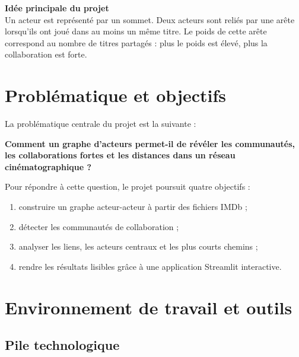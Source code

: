 \documentclass[a4paper,12pt]{article}
\begin{document}
\begin{tcolorbox}[infobox]
\textbf{Idée principale du projet}\\
Un acteur est représenté par un sommet. Deux acteurs sont reliés par une arête lorsqu'ils ont joué dans au moins un même titre. Le poids de cette arête correspond au nombre de titres partagés : plus le poids est élevé, plus la collaboration est forte.
\end{tcolorbox}

\section{Problématique et objectifs}

La problématique centrale du projet est la suivante :

\begin{center}
\begin{tcolorbox}[greenbox, width=0.9\textwidth]
\centering\bfseries
Comment un graphe d'acteurs permet-il de révéler les communautés, les collaborations fortes et les distances dans un réseau cinématographique ?
\end{tcolorbox}
\end{center}

Pour répondre à cette question, le projet poursuit quatre objectifs :

\begin{enumerate}[leftmargin=1.4cm, itemsep=4pt]
  \item construire un graphe acteur-acteur à partir des fichiers IMDb ;
  \item détecter les communautés de collaboration ;
  \item analyser les liens, les acteurs centraux et les plus courts chemins ;
  \item rendre les résultats lisibles grâce à une application Streamlit interactive.
\end{enumerate}

\newpage
\section{Environnement de travail et outils}

\subsection{Pile technologique}
\end{document}
